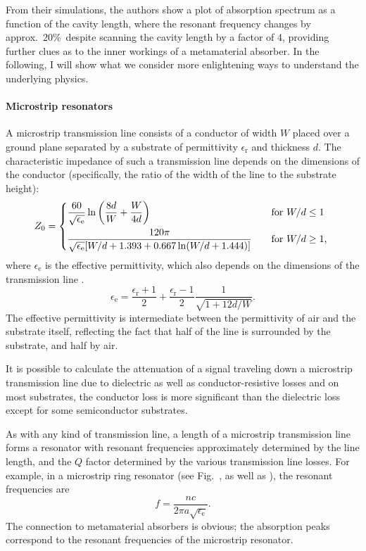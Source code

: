 From their simulations, the authors show a plot of absorption spectrum as a
function of the cavity length, where the resonant frequency changes by approx.\
20\%\ despite scanning the cavity length by a factor of 4, providing further
clues as to the inner workings of a metamaterial absorber. In the following, I
will show what we consider more enlightening ways to understand the underlying
physics.

\paragraph{Microstrip resonators}

A microstrip transmission line consists of a conductor of width $W$ placed over
a ground plane separated by a substrate of permittivity $\epsilon_\text{r}$ and
thickness $d$. The characteristic impedance of such a transmission line depends
on the dimensions of the conductor (specifically, the ratio of the width of the
line to the substrate height):
%
\[
   Z_0=\begin{dcases*}
      \frac{60}{\sqrt{\epsilon_\text{e}}}\ln\left(\frac{8d}{W}+\frac{W}{4d}\right)&\quad for $W/d\leq1$\\
      \frac{120\pi}{\sqrt{\epsilon_\text{e}}[W/d+1.393+0.667\ln(W/d+1.444)]}&\quad
      for $W/d\geq1$,
      \end{dcases*}
\]
%
where $\epsilon_\text{e}$ is the effective permittivity, which also depends on
the dimensions of the transmission line \cite[eqns~3.195--6]{pozar2006microwave}.
%
\[
   \epsilon_\text{e}=\frac{\epsilon_\text{r}+1}{2}+\frac{\epsilon_\text{r}-1}{2}\frac{1}{\sqrt{1+12d/W}}.
\]
%
The effective permittivity is intermediate between the permittivity of air and the
substrate itself, reflecting the fact that half of the line is surrounded by the
substrate, and half by air.

It is possible to calculate the attenuation of a signal traveling down a
microstrip transmission line due to dielectric as well as conductor-resistive
losses \cite[eqns~3.195--6]{pozar2006microwave} and on most substrates, the
conductor loss is more significant than the dielectric loss except for some
semiconductor substrates. \cite{pozar2006microwave}

As with any kind of transmission line, a length of a microstrip transmission
line forms a resonator with resonant frequencies approximately determined by the
line length, and the $Q$ factor determined by the various transmission line
losses. For example, in a microstrip ring resonator (see Fig.~\fref{ring}, as
well as \cite[problem~6.16]{pozar2006microwave}), the resonant frequencies are
%
\[
   f=\frac{nc}{2\pi a\sqrt{\epsilon_\text{e}}}.
\]
%
The connection to metamaterial absorbers is obvious; the absorption peaks
correspond to the resonant frequencies of the microstrip resonator.

